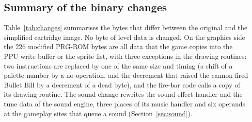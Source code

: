 \documentclass{article}
\begin{document}
\subsection{Summary of the binary changes}
\label{sec:changes}

Table~\ref{tab:changes} summarises the bytes that differ between the original and the simplified
cartridge image. No byte of level data is changed. On the graphics side the 226 modified PRG-ROM
bytes are all data that the game copies into the PPU write buffer or the sprite list, with three
exceptions in the drawing routines: two instructions are replaced by one of the same size and
timing (a shift of a palette number by a no-operation, and the decrement that raised the
cannon-fired Bullet Bill by a decrement of a dead byte), and the fire-bar code calls a copy of its
drawing routine. The sound change rewrites the sound-effect handler and the tune data of the sound
engine, three places of its music handler and six operands at the gameplay sites that queue a
sound (Section~\ref{sec:sound}).
\end{document}
